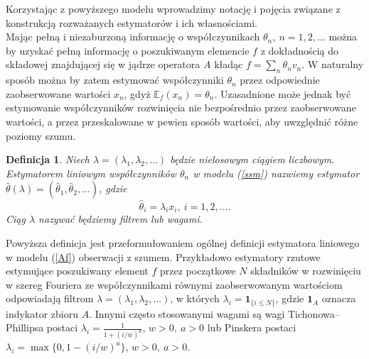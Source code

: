 \documentclass[man,mfiu]{mgrwms}
\newtheorem{df}{Definicja}[chapter]
\begin{document}
Korzystając z powyższego modelu wprowadzimy notację i pojęcia związane z konstrukcją rozważanych estymatorów i ich własnościami.\\
Mając pełną i niezaburzoną informację o współczynnikach $\theta_n,\ n=1,2,\dots$ można by uzyskać pełną informację o poszukiwanym elemencie $f$ z dokładnością do składowej znajdującej się w jądrze operatora $A$ kładąc $f=\sum_n\theta_nv_n$. W naturalny sposób można by zatem estymować współczynniki $\theta_n$ przez odpowiednie zaobserwowane wartości $x_n$, gdyż $\mathbb{E}_f(x_n)=\theta_n$. Uzasadnione może jednak być estymowanie współczynników rozwinięcia nie bezpośrednio przez zaobserwowane wartości, a przez przeskalowane w pewien sposób wartości, aby uwzględnić różne poziomy szumu. 
\begin{df}
Niech $\lambda=(\lambda_1,\lambda_2,\dots)$ będzie nielosowym ciągiem liczbowym. Estymatorem liniowym współczynników $\theta_n$ w modelu (\ref{ssm}) nazwiemy estymator $\hat{\theta}(\lambda)=(\hat{\theta}_1,\hat{\theta}_2,\dots)$, gdzie
\begin{displaymath}
\hat{\theta}_i=\lambda_ix_i,\ i=1,2,\dots.
\end{displaymath}
Ciąg $\lambda$ nazywać będziemy filtrem lub wagami.
\end{df}
Powyższa definicja jest przeformułowaniem ogólnej definicji estymatora liniowego w modelu (\ref{Af}) obserwacji z szumem. 
Przykładowo estymatory rzutowe estymujące poszukiwany element $f$ przez początkowe $N$ składników w rozwinięciu w szereg Fouriera ze współczynnikami równymi zaobserwowanym wartościom odpowiadają filtrom $\lambda=(\lambda_1,\lambda_2,\dots)$, w których $\lambda_i=\pmb{1}_{\{i\leq N\}}$, gdzie $\pmb{1}_A$ oznacza indykator zbioru $A$. Innymi często stosowanymi wagami są wagi Tichonowa-- Phillipsa postaci $\lambda_i=\frac{1}{1+(i/w)^a}$, $w>0,\ a>0$ lub Pinskera postaci $\lambda_i=\max\{0,1-(i/w)^a\}$, $w>0,\ a>0$. \\
\end{document}
